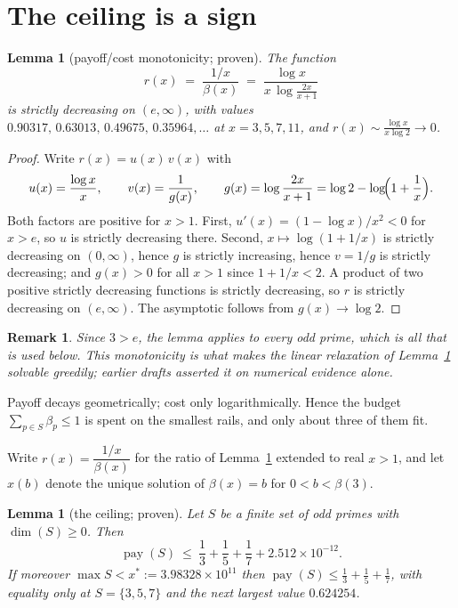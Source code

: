 \documentclass[11pt]{article}
\newtheorem{lemma}[theorem]{Lemma}
\newtheorem{remark}[theorem]{Remark}
\begin{document}
\section{The ceiling is a sign}

\begin{lemma}[payoff/cost monotonicity; proven]\label{lem:ratio}
The function
\[
  r(x)\;=\;\frac{1/x}{\beta(x)}\;=\;\frac{\log x}{x\,\log\frac{2x}{x+1}}
\]
is strictly decreasing on $(e,\infty)$, with values
$0.90317,\,0.63013,\,0.49675,\,0.35964,\dots$ at $x=3,5,7,11$, and
$r(x)\sim\frac{\log x}{x\log2}\to0$.
\end{lemma}

\begin{proof}
Write $r(x)=u(x)\,v(x)$ with
\[
  u(x)=\frac{\log x}{x},\qquad
  v(x)=\frac{1}{g(x)},\qquad
  g(x)=\log\frac{2x}{x+1}=\log2-\log\!\Bigl(1+\frac1x\Bigr).
\]
Both factors are positive for $x>1$.  First, $u'(x)=(1-\log x)/x^{2}<0$ for $x>e$, so $u$ is
strictly decreasing there.  Second, $x\mapsto\log(1+1/x)$ is strictly decreasing on
$(0,\infty)$, hence $g$ is strictly increasing, hence $v=1/g$ is strictly decreasing; and
$g(x)>0$ for all $x>1$ since $1+1/x<2$.  A product of two positive strictly decreasing
functions is strictly decreasing, so $r$ is strictly decreasing on $(e,\infty)$.  The
asymptotic follows from $g(x)\to\log2$.
\end{proof}

\begin{remark}
Since $3>e$, the lemma applies to every odd prime, which is all that is used below.  This
monotonicity is what makes the linear relaxation of Lemma~\ref{lem:ceiling} solvable
greedily; earlier drafts asserted it on numerical evidence alone.
\end{remark}

Payoff decays geometrically; cost only logarithmically.  Hence the budget
$\sum_{p\in S}\beta_p\le1$ is spent on the smallest rails, and only about three
of them fit.

Write $r(x)=\dfrac{1/x}{\beta(x)}$ for the ratio of Lemma~\ref{lem:ratio}
extended to real $x>1$, and let $x(b)$ denote the unique solution of
$\beta(x)=b$ for $0<b<\beta(3)$.

\begin{lemma}[the ceiling; proven]\label{lem:ceiling}
Let $S$ be a finite set of odd primes with $\dim(S)\ge0$.  Then
\[
  \operatorname{pay}(S)\ \le\ \frac13+\frac15+\frac17+2.512\times10^{-12}.
\]
If moreover $\max S<x^\ast:=3.98328\times10^{11}$ then
$\operatorname{pay}(S)\le\frac13+\frac15+\frac17$, with equality only at
$S=\{3,5,7\}$ and the next largest value $0.624254$.
\end{lemma}
\end{document}

